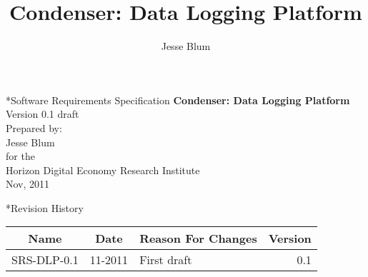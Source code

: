 \documentclass[11pt,a4paper,draft]{article}
\author{Jesse Blum}
\title{Condenser: Data Logging Platform}
\begin{document}
\thispagestyle{empty}
\begin{center}
    \begin{section}*{Software Requirements Specification}     
    \textbf{Condenser: Data Logging Platform}\\
    \medskip
    Version 0.1 draft\\    
    \bigskip
    Prepared by:\\
    Jesse Blum\\
    for the\\
    Horizon Digital Economy Research Institute\\
    Nov, 2011
    \end{section}
\end{center}   
    \bigskip	
    \bigskip
    \bigskip
\begin{center}
    \begin{section}*{Revision History}
    \begin{tabular}{|c|c|l|r|}
    \hline
    \textbf{Name}
    &
    \textbf{Date}
    &
    \textbf{Reason For Changes}
    &
    \textbf{Version}\\
    \hline
    SRS-DLP-0.1&11-2011&First draft&0.1\\
    \hline
    \end{tabular}
    \end{section}
 \end{center} 
    \newpage
    \pagestyle{myheadings}
    \tableofcontents
    \newpage
    
	
	
\end{document}
